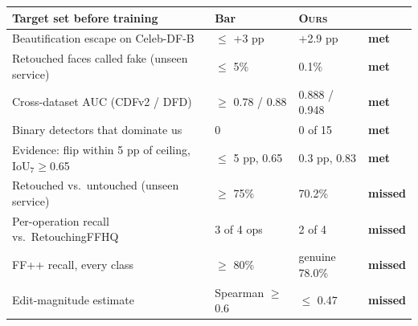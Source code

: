 \documentclass[border=4pt]{standalone}
\begin{document}
\large
\begin{tabular}{llll}
\toprule
Target set before training & Bar & \textsc{Ours} & \\
\midrule
Beautification escape on Celeb-DF-B & $\le$ +3 pp & +2.9 pp & \cellcolor{pass}\textbf{met} \\
Retouched faces called fake (unseen service) & $\le$ 5\% & 0.1\% & \cellcolor{pass}\textbf{met} \\
Cross-dataset AUC (CDFv2 / DFD) & $\ge$ 0.78 / 0.88 & 0.888 / 0.948 & \cellcolor{pass}\textbf{met} \\
Binary detectors that dominate us & 0 & 0 of 15 & \cellcolor{pass}\textbf{met} \\
Evidence: flip within 5 pp of ceiling, IoU$_7\ge$0.65 & $\le$ 5 pp, 0.65 & 0.3 pp, 0.83 & \cellcolor{pass}\textbf{met} \\
\midrule
Retouched vs.\ untouched (unseen service) & $\ge$ 75\% & 70.2\% & \cellcolor{fail}\textbf{missed} \\
Per-operation recall vs.\ RetouchingFFHQ & 3 of 4 ops & 2 of 4 & \cellcolor{fail}\textbf{missed} \\
FF++ recall, every class & $\ge$ 80\% & genuine 78.0\% & \cellcolor{fail}\textbf{missed} \\
Edit-magnitude estimate & Spearman $\ge$ 0.6 & $\le$ 0.47 & \cellcolor{fail}\textbf{missed} \\
\bottomrule
\end{tabular}
\end{document}
